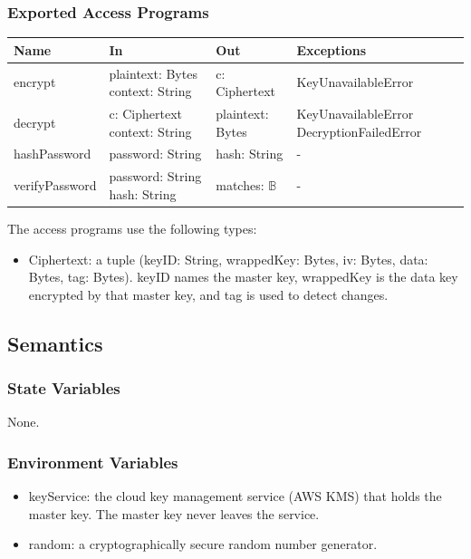 \documentclass[12pt, titlepage]{article}
\begin{document}
\subsubsection{Exported Access Programs}
{\small
\begin{longtable}{>{\raggedright\arraybackslash}p{3.4cm} >{\raggedright\arraybackslash}p{4.3cm} >{\raggedright\arraybackslash}p{3.2cm} >{\raggedright\arraybackslash}p{4.3cm}}
\hline
\textbf{Name} & \textbf{In} & \textbf{Out} & \textbf{Exceptions} \\
\hline
\endhead
encrypt & plaintext: Bytes \newline context: String & c: Ciphertext & KeyUnavailableError \\[4pt]
decrypt & c: Ciphertext \newline context: String & plaintext: Bytes & KeyUnavailableError \newline DecryptionFailedError \\[4pt]
hashPassword & password: String & hash: String & - \\[4pt]
verifyPassword & password: String \newline hash: String & matches: $\mathbb{B}$ & - \\[4pt]
\hline
\end{longtable}
}

\noindent The access programs use the following types:
\begin{itemize}
\item Ciphertext: a tuple (keyID: String, wrappedKey: Bytes, iv: Bytes, data: Bytes, tag: Bytes). keyID names the master key, wrappedKey is the data key encrypted by that master key, and tag is used to detect changes.
\end{itemize}

\subsection{Semantics}

\subsubsection{State Variables}
None.

\subsubsection{Environment Variables}
\begin{itemize}
\item keyService: the cloud key management service (AWS KMS) that holds the master key. The master key never leaves the service.
\item random: a cryptographically secure random number generator.
\end{itemize}
\end{document}
